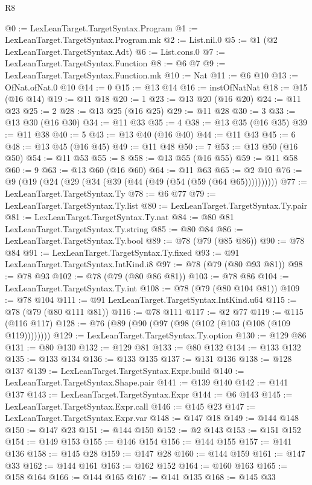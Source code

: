 \begin{lexlean}{R8}
\begin{coremodule}
{{{{{{{{{{{{{{{{{{{{{{{{{{{{{{{{{{{{{{{{@0 := LexLeanTarget.TargetSyntax.Program
@1 := LexLeanTarget.TargetSyntax.Program.mk
@2 := List.nil.{0}
@5 := @1 (@2 LexLeanTarget.TargetSyntax.Adt)
@6 := List.cons.{0}
@7 := LexLeanTarget.TargetSyntax.Function
@8 := @6 @7
@9 := LexLeanTarget.TargetSyntax.Function.mk
@10 := Nat
@11 := @6 @10
@13 := OfNat.ofNat.{0} @10
@14 := 0
@15 := @13 @14
@16 := instOfNatNat
@18 := @15 (@16 @14)
@19 := @11 @18
@20 := 1
@23 := @13 @20 (@16 @20)
@24 := @11 @23
@25 := 2
@28 := @13 @25 (@16 @25)
@29 := @11 @28
@30 := 3
@33 := @13 @30 (@16 @30)
@34 := @11 @33
@35 := 4
@38 := @13 @35 (@16 @35)
@39 := @11 @38
@40 := 5
@43 := @13 @40 (@16 @40)
@44 := @11 @43
@45 := 6
@48 := @13 @45 (@16 @45)
@49 := @11 @48
@50 := 7
@53 := @13 @50 (@16 @50)
@54 := @11 @53
@55 := 8
@58 := @13 @55 (@16 @55)
@59 := @11 @58
@60 := 9
@63 := @13 @60 (@16 @60)
@64 := @11 @63
@65 := @2 @10
@76 := @9 (@19 (@24 (@29 (@34 (@39 (@44 (@49 (@54 (@59 (@64 @65))))))))))
@77 := LexLeanTarget.TargetSyntax.Ty
@78 := @6 @77
@79 := LexLeanTarget.TargetSyntax.Ty.list
@80 := LexLeanTarget.TargetSyntax.Ty.pair
@81 := LexLeanTarget.TargetSyntax.Ty.nat
@84 := @80 @81 LexLeanTarget.TargetSyntax.Ty.string
@85 := @80 @84
@86 := LexLeanTarget.TargetSyntax.Ty.bool
@89 := @78 (@79 (@85 @86))
@90 := @78 @84
@91 := LexLeanTarget.TargetSyntax.Ty.fixed
@93 := @91 LexLeanTarget.TargetSyntax.IntKind.i8
@97 := @78 (@79 (@80 @93 @81))
@98 := @78 @93
@102 := @78 (@79 (@80 @86 @81))
@103 := @78 @86
@104 := LexLeanTarget.TargetSyntax.Ty.int
@108 := @78 (@79 (@80 @104 @81))
@109 := @78 @104
@111 := @91 LexLeanTarget.TargetSyntax.IntKind.u64
@115 := @78 (@79 (@80 @111 @81))
@116 := @78 @111
@117 := @2 @77
@119 := @115 (@116 @117)
@128 := @76 (@89 (@90 (@97 (@98 (@102 (@103 (@108 (@109 @119))))))))
@129 := LexLeanTarget.TargetSyntax.Ty.option
@130 := @129 @86
@131 := @80 @130
@132 := @129 @81
@133 := @80 @132
@134 := @133 @132
@135 := @133 @134
@136 := @133 @135
@137 := @131 @136
@138 := @128 @137
@139 := LexLeanTarget.TargetSyntax.Expr.build
@140 := LexLeanTarget.TargetSyntax.Shape.pair
@141 := @139 @140
@142 := @141 @137
@143 := LexLeanTarget.TargetSyntax.Expr
@144 := @6 @143
@145 := LexLeanTarget.TargetSyntax.Expr.call
@146 := @145 @23
@147 := LexLeanTarget.TargetSyntax.Expr.var
@148 := @147 @18
@149 := @144 @148
@150 := @147 @23
@151 := @144 @150
@152 := @2 @143
@153 := @151 @152
@154 := @149 @153
@155 := @146 @154
@156 := @144 @155
@157 := @141 @136
@158 := @145 @28
@159 := @147 @28
@160 := @144 @159
@161 := @147 @33
@162 := @144 @161
@163 := @162 @152
@164 := @160 @163
@165 := @158 @164
@166 := @144 @165
@167 := @141 @135
@168 := @145 @33
}}}}}}}}}}}}}}}}}}}}}}}}}}}}}}}}}}}}}}}}
\end{coremodule}
\end{lexlean}
